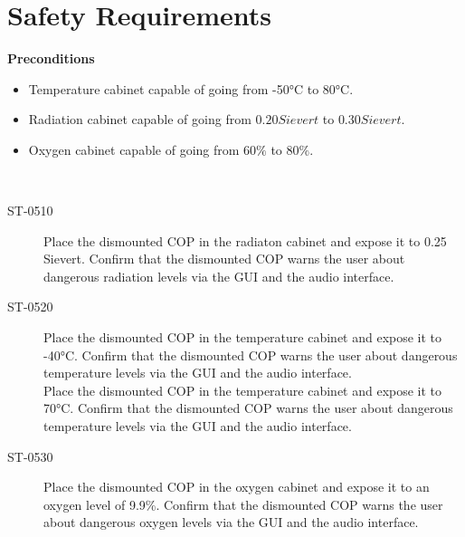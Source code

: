 \section{Safety Requirements}
\textbf{Preconditions}
\begin{itemize}
\item Temperature cabinet capable of going from -50°C to 80°C.
\item Radiation cabinet capable of going from $0.20 Sievert$ to $0.30 Sievert$.
\item Oxygen cabinet capable of going from $60 \%$ to $80 \%$.
\end{itemize}
~\

\begin{description}
\item[ST-0510] Place the dismounted COP in the radiaton cabinet and expose it to 0.25 Sievert. Confirm that the dismounted COP warns the user about dangerous radiation levels via the GUI and the audio interface.
\item[ST-0520] Place the dismounted COP in the temperature cabinet and expose it to -40°C. Confirm that the dismounted COP warns the user about dangerous temperature levels via the GUI and the audio interface.\\
Place the dismounted COP in the temperature cabinet and expose it to 70°C. Confirm that the dismounted COP warns the user about dangerous temperature levels via the GUI and the audio interface.
\item[ST-0530] Place the dismounted COP in the oxygen cabinet and expose it to an oxygen level of 9.9\%. Confirm that the dismounted COP warns the user about dangerous oxygen levels via the GUI and the audio interface.
\end{description}